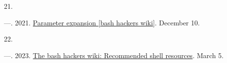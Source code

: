 \documentclass[
  a4paper,
]{article}
\newlength{\cslhangindent}
\newlength{\csllabelwidth}
\newlength{\cslentryspacingunit} %
\newenvironment{CSLReferences}[2] %
 {%
  \setlength{\parindent}{0pt}
  \ifodd #1
  \let\oldpar\par
  \def\par{\hangindent=\cslhangindent\oldpar}
  \fi
  \setlength{\parskip}{#2\cslentryspacingunit}
 }%
 {}
\newcommand{\CSLLeftMargin}[1]{\parbox[t]{\csllabelwidth}{#1}}
\newcommand{\CSLRightInline}[1]{\parbox[t]{\linewidth - \csllabelwidth}{#1}\break}
\begin{document}
\begin{CSLReferences}{0}{0}
\leavevmode{}%
\CSLLeftMargin{21. }%
\CSLRightInline{---. 2021.
\href{https://wiki.bash-hackers.org/syntax/pe\#substring_removal}{Parameter
expansion {[}bash hackers wiki{]}}. December 10.}

\leavevmode{}%
\CSLLeftMargin{22. }%
\CSLRightInline{---. 2023.
\href{https://wiki.bash-hackers.org/start\#recommended_shell_resources}{The
bash hackers wiki: Recommended shell resources}. March 5.}

\end{CSLReferences}
\end{document}
